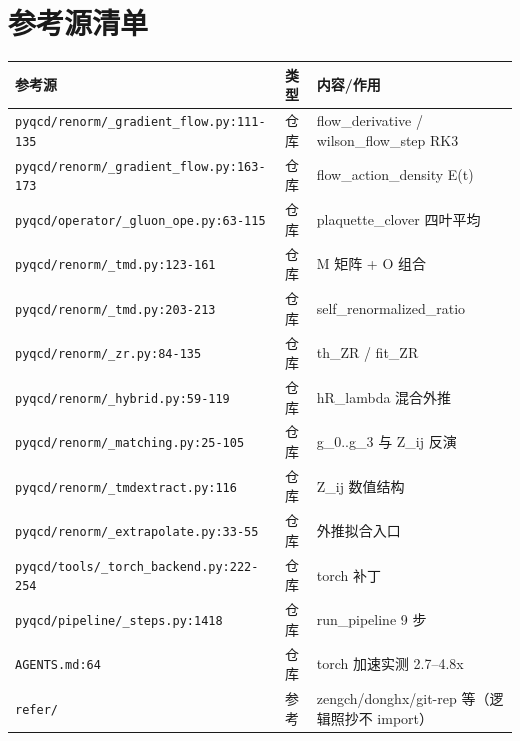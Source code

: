 \documentclass[UTF8]{ctexart}
\begin{document}
\section{参考源清单}
\begin{xltabular}{\textwidth}{llX}
\toprule
\textcolor{evidence}{参考源} & 类型 & 内容/作用 \\
\midrule
\endhead
\texttt{\nolinkurl{pyqcd/renorm/_gradient_flow.py:111-135}} & 仓库 & flow\_derivative / wilson\_flow\_step RK3 \\
\texttt{\nolinkurl{pyqcd/renorm/_gradient_flow.py:163-173}} & 仓库 & flow\_action\_density E(t) \\
\texttt{\nolinkurl{pyqcd/operator/_gluon_ope.py:63-115}} & 仓库 & plaquette\_clover 四叶平均 \\
\texttt{\nolinkurl{pyqcd/renorm/_tmd.py:123-161}} & 仓库 & M 矩阵 + O 组合 \\
\texttt{\nolinkurl{pyqcd/renorm/_tmd.py:203-213}} & 仓库 & self\_renormalized\_ratio \\
\texttt{\nolinkurl{pyqcd/renorm/_zr.py:84-135}} & 仓库 & th\_ZR / fit\_ZR \\
\texttt{\nolinkurl{pyqcd/renorm/_hybrid.py:59-119}} & 仓库 & hR\_lambda 混合外推 \\
\texttt{\nolinkurl{pyqcd/renorm/_matching.py:25-105}} & 仓库 & g\_0..g\_3 与 Z\_ij 反演 \\
\texttt{\nolinkurl{pyqcd/renorm/_tmdextract.py:116}} & 仓库 & Z\_ij 数值结构 \\
\texttt{\nolinkurl{pyqcd/renorm/_extrapolate.py:33-55}} & 仓库 & 外推拟合入口 \\
\texttt{\nolinkurl{pyqcd/tools/_torch_backend.py:222-254}} & 仓库 & torch 补丁 \\
\texttt{\nolinkurl{pyqcd/pipeline/_steps.py:1418}} & 仓库 & run\_pipeline 9 步 \\
\texttt{\nolinkurl{AGENTS.md:64}} & 仓库 & torch 加速实测 2.7--4.8x \\
\texttt{\nolinkurl{refer/}} & 参考 & zengch/donghx/git-rep 等（逻辑照抄不 import） \\
\bottomrule
\end{xltabular}

\end{document}
